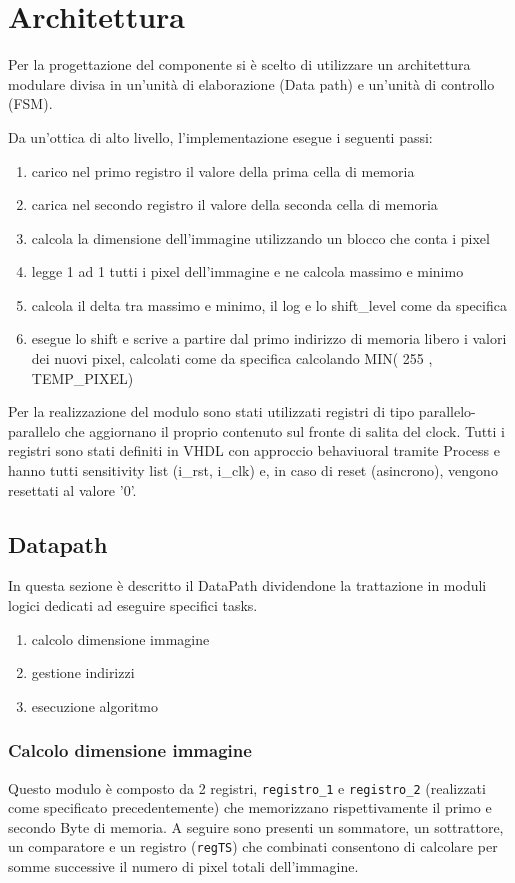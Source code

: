 \section{Architettura}
Per la progettazione del componente si è scelto di utilizzare un architettura modulare divisa in un'unità di elaborazione (Data path) e un'unità di controllo (FSM).

Da un'ottica di alto livello, l'implementazione esegue i seguenti passi:
\begin{enumerate}
\item carico nel primo registro il valore della prima cella di memoria
\item carica nel secondo registro il valore della seconda cella di memoria
\item calcola la dimensione dell'immagine utilizzando un blocco che conta i pixel
\item legge 1 ad 1 tutti i pixel dell'immagine e ne calcola massimo e minimo
\item calcola il delta tra massimo e minimo, il log e lo shift\_level come da specifica
\item esegue lo shift e scrive a partire dal primo indirizzo di memoria libero i valori dei nuovi pixel, calcolati come da specifica calcolando MIN( 255 , TEMP\_PIXEL)
\end{enumerate}

Per la realizzazione del modulo sono stati utilizzati registri di tipo parallelo-parallelo che aggiornano il proprio contenuto sul fronte di salita del clock. 
Tutti i registri sono stati definiti in VHDL con approccio behaviuoral tramite Process e hanno tutti sensitivity list (i\_rst, i\_clk) e, in caso di reset (asincrono), vengono resettati al valore '0'.

\subsection{Datapath}
In questa sezione è descritto il DataPath dividendone la trattazione in moduli logici dedicati ad eseguire specifici tasks.

\begin{enumerate}
\item calcolo dimensione immagine
\item gestione indirizzi
\item esecuzione algoritmo
\end{enumerate}

\subsubsection{Calcolo dimensione immagine} 
Questo modulo è composto da 2 registri, \texttt{registro\_1} e \texttt{registro\_2} (realizzati come specificato precedentemente) che memorizzano rispettivamente il primo e secondo Byte di memoria.
A seguire sono presenti un sommatore, un sottrattore, un comparatore e un registro (\texttt{regTS})  che combinati consentono di calcolare per somme successive il numero di pixel totali dell'immagine.

